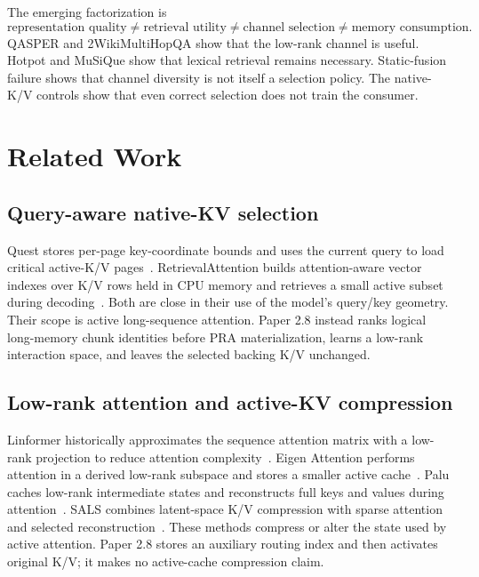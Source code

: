 \documentclass[11pt]{article}
\newcommand{\pra}{\textsc{PRA}\xspace}
\newcommand{\kv}{\textsc{K/V}\xspace}
\newcommand{\twowiki}{2WikiMultiHopQA\xspace}
\newcommand{\musique}{MuSiQue\xspace}
\begin{document}
The emerging factorization is
\begin{equation}
\text{representation quality}\ne\text{retrieval utility}
\ne\text{channel selection}\ne\text{memory consumption}.
\end{equation}
QASPER and \twowiki show that the low-rank channel is useful. Hotpot and
\musique show that lexical retrieval remains necessary. Static-fusion failure
shows that channel diversity is not itself a selection policy. The native-\kv
controls show that even correct selection does not train the consumer.

\section{Related Work}
\subsection{Query-aware native-KV selection}
Quest stores per-page key-coordinate bounds and uses the current query to load
critical active-\kv pages~\cite{tang2024quest}. RetrievalAttention builds
attention-aware vector indexes over \kv rows held in CPU memory and retrieves a
small active subset during decoding~\cite{liu2024retrievalattention}. Both are
close in their use of the model's query/key geometry. Their scope is active
long-sequence attention. Paper 2.8 instead ranks logical long-memory chunk
identities before \pra materialization, learns a low-rank interaction space,
and leaves the selected backing \kv unchanged.

\subsection{Low-rank attention and active-KV compression}
Linformer historically approximates the sequence attention matrix with a
low-rank projection to reduce attention complexity~\cite{wang2020linformer}.
Eigen Attention performs attention in a derived low-rank subspace and stores a
smaller active cache~\cite{saxena2024eigen}. Palu caches low-rank intermediate
states and reconstructs full keys and values during attention~\cite{chang2025palu}.
SALS combines latent-space \kv compression with sparse attention and selected
reconstruction~\cite{zhang2025sals}. These methods compress or alter the state
used by active attention. Paper 2.8 stores an auxiliary routing index and then
activates original \kv; it makes no active-cache compression claim.
\end{document}

